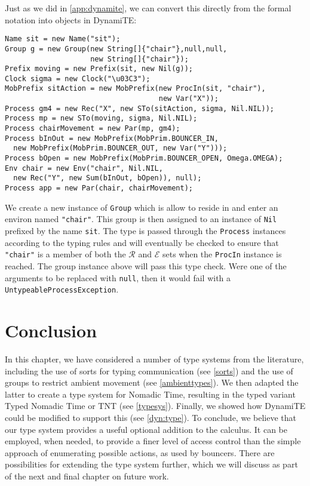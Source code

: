 Just as we did in \ref{app:dynamite}, we can convert this directly
from the formal notation into objects in DynamiTE:

\begin{verbatim}
Name sit = new Name("sit");
Group g = new Group(new String[]{"chair"},null,null,
                    new String[]{"chair"}); 
Prefix moving = new Prefix(sit, new Nil(g));
Clock sigma = new Clock("\u03C3");
MobPrefix sitAction = new MobPrefix(new ProcIn(sit, "chair"),
                                    new Var("X"));
Process gm4 = new Rec("X", new STo(sitAction, sigma, Nil.NIL));
Process mp = new STo(moving, sigma, Nil.NIL);
Process chairMovement = new Par(mp, gm4);
Process bInOut = new MobPrefix(MobPrim.BOUNCER_IN,
  new MobPrefix(MobPrim.BOUNCER_OUT, new Var("Y")));
Process bOpen = new MobPrefix(MobPrim.BOUNCER_OPEN, Omega.OMEGA);
Env chair = new Env("chair", Nil.NIL,
  new Rec("Y", new Sum(bInOut, bOpen)), null);
Process app = new Par(chair, chairMovement);
\end{verbatim} 

\noindent We create a new instance of \texttt{Group} which is allow to
reside in and enter an environ named \verb!"chair"!.  This group
is then assigned to an instance of \texttt{Nil} prefixed by the name
\texttt{sit}.  The type is passed through the \texttt{Process}
instances according to the typing rules and will eventually be checked
to ensure that \verb!"chair"! is a member of both the
$\mathscr{R}$ and $\mathscr{E}$ sets when the \texttt{ProcIn} instance
is reached.  The group instance above will pass this type check.  Were
one of the arguments to be replaced with \texttt{null}, then it would
fail with a \texttt{UntypeableProcessException}.

\section{Conclusion}

In this chapter, we have considered a number of type systems from the
literature, including the use of sorts for typing communication (see
\ref{sorts}) and the use of groups to restrict ambient movement (see
\ref{ambienttypes}).  We then adapted the latter to create a type
system for Nomadic Time, resulting in the typed variant Typed Nomadic
Time or TNT (see \ref{typesys}). Finally, we showed how DynamiTE could
be modified to support this (see \ref{dyn:type}).  To conclude, we
believe that our type system provides a useful optional addition to
the calculus.  It can be employed, when needed, to provide a finer
level of access control than the simple approach of enumerating
possible actions, as used by bouncers.  There are possibilities for
extending the type system further, which we will discuss as part of
the next and final chapter on future work.
